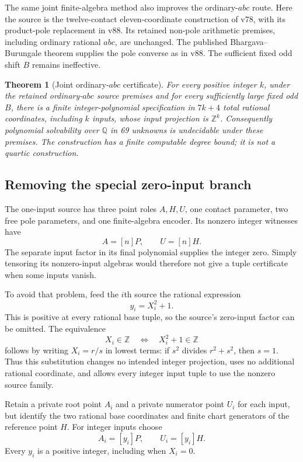 \documentclass[11pt]{article}
\newtheorem{theorem}{Theorem}
\begin{document}
The same joint finite-algebra method also improves the ordinary-$abc$
route.  Here the source is the twelve-contact eleven-coordinate
construction of v78, with its product-pole replacement in v88.
Its retained non-pole arithmetic premises, including ordinary
rational $abc$, are unchanged.  The published Bhargava--Burungale
theorem supplies the pole converse as in v88.  The sufficient fixed
odd shift $B$ remains ineffective.

\begin{theorem}[Joint ordinary-$abc$ certificate]
\label{thm:joint-abc}
For every positive integer $k$, under the retained ordinary-$abc$
source premises and for every sufficiently large fixed odd $B$,
there is a finite integer-polynomial specification in $7k+4$ total
rational coordinates, including $k$ inputs, whose input projection
is $\mathbb Z^k$.  Consequently polynomial solvability over
$\mathbb Q$ in 69 unknowns is undecidable under these premises.
The construction has a finite computable degree bound; it is not
a quartic construction.
\end{theorem}

\subsection{Removing the special zero-input branch}

The one-input source has three point roles $A,H,U$, one contact
parameter, two free pole parameters, and one finite-algebra encoder.
Its nonzero integer witnesses have
\[
                       A=[n]P,\qquad U=[n]H.
\]
The separate input factor in its final polynomial supplies the
integer zero.  Simply tensoring its nonzero-input algebras would
therefore not give a tuple certificate when some inputs vanish.

To avoid that problem, feed the $i$th source the rational expression
\[
                            y_i=X_i^2+1.
\]
This is positive at every rational base tuple, so the source's
zero-input factor can be omitted.  The equivalence
\[
                         X_i\in\mathbb Z
                    \quad\Longleftrightarrow\quad
                         X_i^2+1\in\mathbb Z
\]
follows by writing $X_i=r/s$ in lowest terms: if $s^2$ divides
$r^2+s^2$, then $s=1$.  Thus this substitution changes no intended
integer projection, uses no additional rational coordinate, and
allows every integer input tuple to use the nonzero source family.

Retain a private root point $A_i$ and a private numerator point
$U_i$ for each input, but identify the two rational base coordinates
and finite chart generators of the reference point $H$.  For
integer inputs choose
\[
                         A_i=[y_i]P,
                    \qquad U_i=[y_i]H.
\]
Every $y_i$ is a positive integer, including when $X_i=0$.
\end{document}
